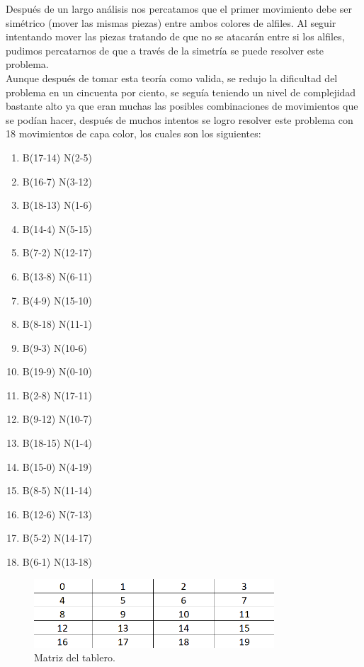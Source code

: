 \documentclass[12pt]{article}
\begin{document}
Después de un largo análisis nos percatamos que el primer movimiento debe ser simétrico (mover las mismas piezas) entre ambos colores de alfiles. Al seguir intentando mover las piezas tratando de que no se atacarán entre si los alfiles, pudimos percatarnos de que a través de la simetría se puede resolver este problema.\\

Aunque después de tomar esta teoría como valida, se redujo la dificultad del problema en un cincuenta por ciento, se seguía teniendo un nivel de complejidad bastante alto ya que eran muchas las posibles combinaciones de movimientos que se podían hacer, después de muchos intentos se logro resolver este problema con 18 movimientos de capa color, los cuales son los siguientes: 

\begin{multicols}{2}
\begin{enumerate}
    \item B(17-14) N(2-5)
    \item B(16-7) N(3-12)
    \item B(18-13) N(1-6)
    \item B(14-4) N(5-15)
    \item B(7-2) N(12-17)
    \item B(13-8) N(6-11)
    \item B(4-9) N(15-10)
    \item B(8-18) N(11-1)
    \item B(9-3) N(10-6)
    \item B(19-9) N(0-10)
    \item B(2-8) N(17-11)
    \item B(9-12) N(10-7)
    \item B(18-15) N(1-4)
    \item B(15-0) N(4-19)
    \item B(8-5) N(11-14)
    \item B(12-6) N(7-13)
    \item B(5-2) N(14-17)
    \item B(6-1) N(13-18)
\end{enumerate}
\end{multicols}

\begin{figure}[h]
\centering
\includegraphics[width=0.8\textwidth]{2.png}
\caption{\label{fig:xx}Matriz del tablero.}
\end{figure}
\end{document}
